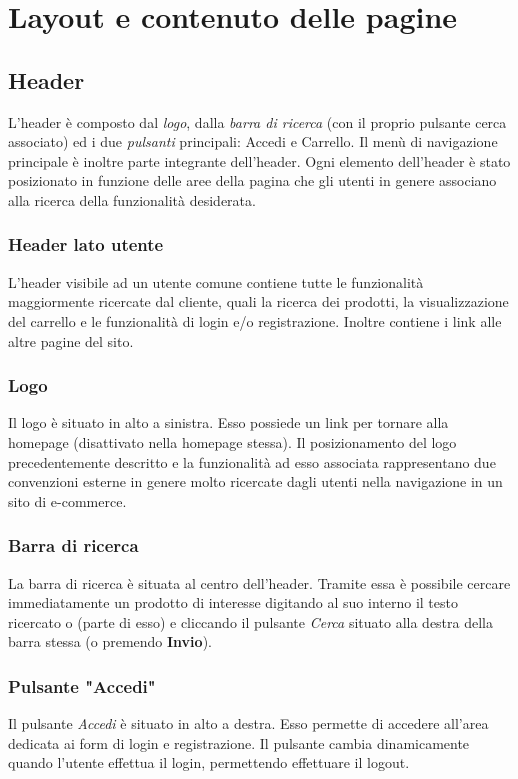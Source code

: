 \newpage
\section{Layout e contenuto delle pagine}

\subsection{Header}
L'header è composto dal \textit{logo}, dalla \textit{barra di ricerca} (con il proprio pulsante cerca associato) ed i due \textit{pulsanti} principali: Accedi e Carrello. Il menù di navigazione principale è inoltre parte integrante dell'header.
Ogni elemento dell'header è stato posizionato in funzione delle aree della pagina che gli utenti in genere associano alla ricerca della funzionalità desiderata. 

\subsubsection{Header lato utente}
L'header visibile ad un utente comune contiene tutte le funzionalità maggiormente ricercate dal cliente, quali la ricerca dei prodotti, la visualizzazione del carrello e le funzionalità di login e/o registrazione. Inoltre contiene i link alle altre pagine del sito.

\subsubsection{Logo} 
Il logo è situato in alto a sinistra. Esso possiede un link per tornare alla homepage (disattivato nella homepage stessa). Il posizionamento del logo precedentemente descritto e la funzionalità ad esso associata rappresentano due convenzioni esterne in genere molto ricercate dagli utenti nella navigazione in un sito di e-commerce.

\subsubsection{Barra di ricerca}
La barra di ricerca è situata al centro dell'header. Tramite essa è possibile cercare immediatamente un prodotto di interesse digitando al suo interno il testo ricercato o (parte di esso) e cliccando il pulsante \textit{Cerca} situato alla destra della barra stessa (o premendo \textbf{Invio}). 

\subsubsection{Pulsante "Accedi"}
Il pulsante \textit{Accedi} è situato in alto a destra. Esso permette di accedere all'area dedicata ai form di login e registrazione. Il pulsante cambia dinamicamente quando l'utente effettua il login, permettendo effettuare il logout. 

